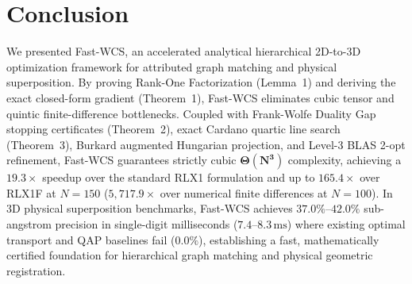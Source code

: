 \documentclass[conference]{IEEEtran}
\begin{document}

\section{Conclusion}
\label{sec:conclusion}

We presented Fast-WCS, an accelerated analytical hierarchical 2D-to-3D optimization framework for attributed graph matching and physical superposition. By proving Rank-One Factorization (Lemma~1) and deriving the exact closed-form gradient (Theorem~1), Fast-WCS eliminates cubic tensor and quintic finite-difference bottlenecks. Coupled with Frank-Wolfe Duality Gap stopping certificates (Theorem~2), exact Cardano quartic line search (Theorem~3), Burkard augmented Hungarian projection, and Level-3 BLAS 2-opt refinement, Fast-WCS guarantees strictly cubic $\mathbf{\Theta(N^3)}$ complexity, achieving a $19.3\times$ speedup over the standard RLX1 formulation and up to $165.4\times$ over RLX1F at $N=150$ ($5,717.9\times$ over numerical finite differences at $N=100$). In 3D physical superposition benchmarks, Fast-WCS achieves $\mathbf{37.0\%\text{--}42.0\%}$ sub-angstrom precision in single-digit milliseconds ($7.4\text{--}8.3\,\text{ms}$) where existing optimal transport and QAP baselines fail ($0.0\%$), establishing a fast, mathematically certified foundation for hierarchical graph matching and physical geometric registration.

\end{document}
